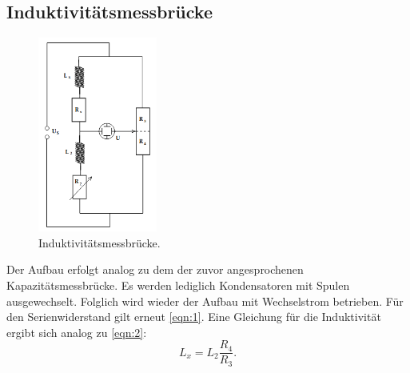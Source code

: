 \subsection{Induktivitätsmessbrücke}
\begin{figure}[H]
    \centering
        \centering
        \includegraphics[width=0.35\textwidth]{Bilder/induktivitaetsmess.png}
        \caption{Induktivitätsmessbrücke. \cite{anleitung}}
    \hfill
    \label{fig:f4}
\end{figure}
\noindent Der Aufbau erfolgt analog zu dem der zuvor angesprochenen 
Kapazitätsmessbrücke. Es werden lediglich Kondensatoren mit Spulen ausgewechselt.
Folglich wird wieder der Aufbau mit Wechselstrom betrieben. Für den Serienwiderstand 
gilt erneut \autoref{eqn:1}. Eine Gleichung für die Induktivität ergibt sich 
analog zu \autoref{eqn:2}:
\begin{equation}
    \label{eqn:3}
    L_x = L_2 \frac{R_4}{R_3}.
\end{equation}

